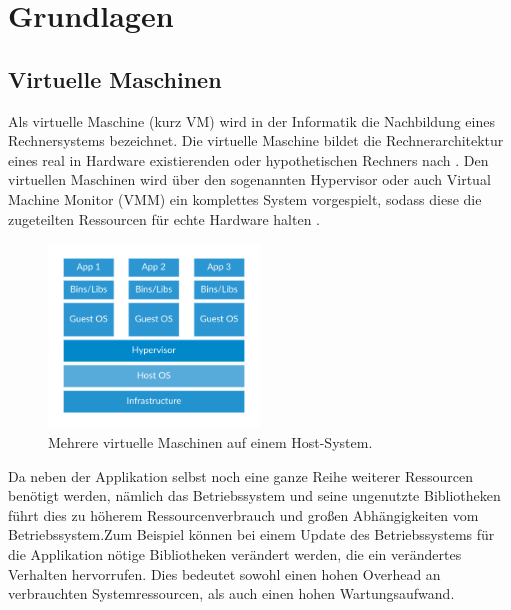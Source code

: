 \chapter{Grundlagen}


\section{Virtuelle Maschinen}
Als virtuelle Maschine (kurz VM) wird in der Informatik die Nachbildung eines Rechnersystems bezeichnet. Die virtuelle Maschine bildet die Rechnerarchitektur eines real in Hardware existierenden oder hypothetischen Rechners nach \cite{Sieg2007}. Den virtuellen Maschinen wird über den sogenannten Hypervisor oder auch Virtual Machine Monitor (VMM) ein komplettes System vorgespielt, sodass diese die zugeteilten Ressourcen für echte Hardware halten \cite{OSTEP}.\\

\begin{figure}[!ht] %
  \centering
  \includegraphics[width=0.5\textwidth]{images/docker-vm.png}
  \caption{Mehrere virtuelle Maschinen auf einem Host-System. \cite{docker}}
\end{figure}

Da neben der Applikation selbst noch eine ganze Reihe weiterer Ressourcen benötigt werden, nämlich das Betriebssystem und seine ungenutzte Bibliotheken führt dies zu höherem Ressourcenverbrauch und großen Abhängigkeiten vom Betriebssystem.\linebreak Zum Beispiel können bei einem Update des Betriebssystems für die Applikation nötige Bibliotheken verändert werden, die ein verändertes Verhalten hervorrufen. Dies bedeutet sowohl einen hohen Overhead an verbrauchten Systemressourcen, als auch einen hohen Wartungsaufwand.\\

